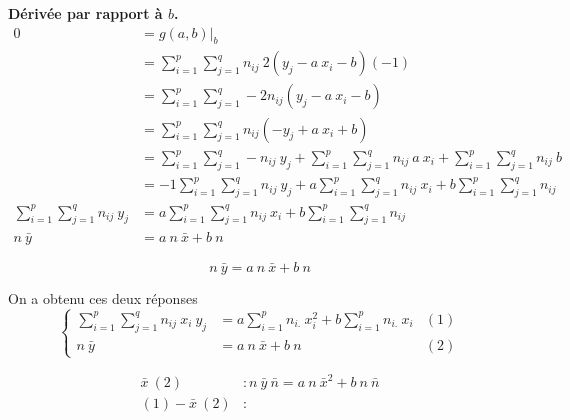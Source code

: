 \textbf{Dérivée par rapport à $b$.}
\begin{align*}
0 &= \left.g(a,b)\right|_b\\
  &= \sum_{i=1}^{p} \sum_{j=1}^{q} n_{ij}\ 2(y_j - a\ x_i-b)(-1)\\
  &= \sum_{i=1}^{p} \sum_{j=1}^{q} -2n_{ij}(y_j - a\ x_i - b)\\
  &= \sum_{i=1}^{p} \sum_{j=1}^{q} n_{ij}(-y_j + a\ x_i + b)\\
  &= \sum_{i=1}^{p} \sum_{j=1}^{q} -n_{ij}\ y_j + \sum_{i=1}^{p} \sum_{j=1}^{q} n_{ij}\ a\ x_i + \sum_{i=1}^{p} \sum_{j=1}^{q} n_{ij}\ b\\
  &= -1 \sum_{i=1}^{p} \sum_{j=1}^{q} n_{ij}\ y_j + a \sum_{i=1}^{p} \sum_{j=1}^{q} n_{ij}\ x_i + b \sum_{i=1}^{p} \sum_{j=1}^{q} n_{ij}\\
\sum_{i=1}^{p} \sum_{j=1}^{q} n_{ij}\ y_j &= a \sum_{i=1}^{p} \sum_{j=1}^{q} n_{ij}\ x_i + b \sum_{i=1}^{p} \sum_{j=1}^{q} n_{ij}\\
n\ \bar{y} &= a\ n\ \bar{x} + b\ n
\end{align*}

$$\boxed{n\ \bar{y} = a\ n\ \bar{x} + b\ n}$$


On a obtenu ces deux réponses
\begin{equation*}
\left\{
\begin{aligned}
	\sum_{i=1}^{p} \sum_{j=1}^{q} n_{ij}\ x_i\ y_j &= a \sum_{i=1}^{p} n_{i.}\ x_i^2 + b \sum_{i=1}^{p} n_{i.}\ x_i &(1)\\
	n\ \bar{y} &= a\ n\ \bar{x} + b\ n &(2)
\end{aligned}
\right.
\end{equation*}


\begin{align*}
	\bar{x}\ (2) &: n\ \bar{y}\ \bar{n} = a\ n\ \bar{x}^2 + b\ n\ \bar{n}\\
	(1) - \bar{x}\ (2) &: 
\end{align*}